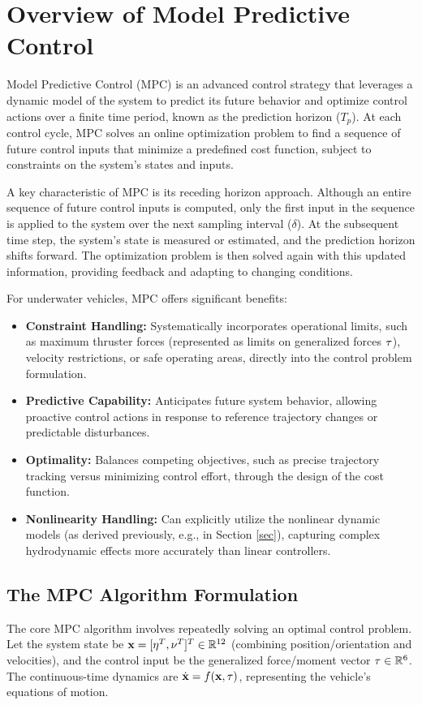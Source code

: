 \section{Overview of Model Predictive Control}

Model Predictive Control (MPC) is an advanced control strategy that leverages a dynamic model of the system to predict its future behavior and optimize control actions over a finite time period, known as the prediction horizon ($T_p$). At each control cycle, MPC solves an online optimization problem to find a sequence of future control inputs that minimize a predefined cost function, subject to constraints on the system's states and inputs.

A key characteristic of MPC is its receding horizon approach. Although an entire sequence of future control inputs is computed, only the first input in the sequence is applied to the system over the next sampling interval ($\delta$). At the subsequent time step, the system's state is measured or estimated, and the prediction horizon shifts forward. The optimization problem is then solved again with this updated information, providing feedback and adapting to changing conditions.

For underwater vehicles, MPC offers significant benefits:
\begin{itemize}
    \item \textbf{Constraint Handling:} Systematically incorporates operational limits, such as maximum thruster forces (represented as limits on generalized forces $\mathbf{\tau}$), velocity restrictions, or safe operating areas, directly into the control problem formulation.
    \item \textbf{Predictive Capability:} Anticipates future system behavior, allowing proactive control actions in response to reference trajectory changes or predictable disturbances.
    \item \textbf{Optimality:} Balances competing objectives, such as precise trajectory tracking versus minimizing control effort, through the design of the cost function.
    \item \textbf{Nonlinearity Handling:} Can explicitly utilize the nonlinear dynamic models (as derived previously, e.g., in Section \ref{sec}), capturing complex hydrodynamic effects more accurately than linear controllers.
\end{itemize}

\subsection{The MPC Algorithm Formulation}
The core MPC algorithm involves repeatedly solving an optimal control problem. Let the system state be $\mathbf{x} = [\mathbf{\eta}^T, \mathbf{\nu}^T]^T \in \mathbb{R}^{12}$ (combining position/orientation and velocities), and the control input be the generalized force/moment vector $\mathbf{\tau} \in \mathbb{R}^6$. The continuous-time dynamics are $\dot{\mathbf{x}} = f(\mathbf{x}, \mathbf{\tau})$, representing the vehicle's equations of motion.

